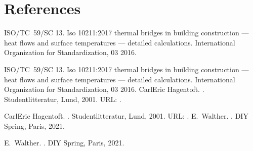 \documentclass[letterpaper,10pt,english]{jupyterBook}
\begin{document}
\section{References}
\label{\detokenize{Aufgabe1:references}}
\begin{sphinxthebibliography}{1}
\sphinxAtStartPar
ISO/TC 59/SC 13. Iso 10211:2017 thermal bridges in building construction — heat flows and surface temperatures — detailed calculations. International Organization for Standardization, 03 2016.

\sphinxAtStartPar
ISO/TC 59/SC 13. Iso 10211:2017 thermal bridges in building construction — heat flows and surface temperatures — detailed calculations. International Organization for Standardization, 03 2016.
\sphinxAtStartPar
Carl\sphinxhyphen{}Eric Hagentoft. . Studentlitteratur, Lund, 2001. URL: .

\sphinxAtStartPar
Carl\sphinxhyphen{}Eric Hagentoft. . Studentlitteratur, Lund, 2001. URL: .
\sphinxAtStartPar
E. Walther. . DIY Spring, Paris, 2021.

\sphinxAtStartPar
E. Walther. . DIY Spring, Paris, 2021.
\end{sphinxthebibliography}







\renewcommand{\indexname}{Index}
\printindex
\end{document}
